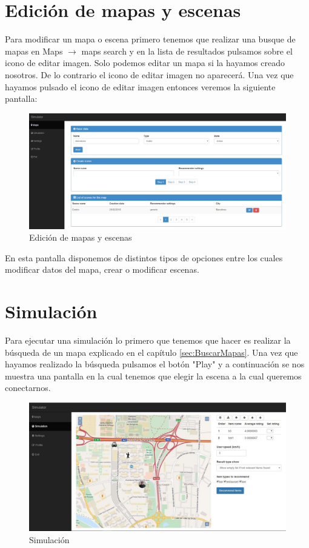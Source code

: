 \section{Edición de mapas y escenas}

Para modificar un mapa o escena primero tenemos que realizar una busque de mapas en Maps $\rightarrow$ maps search y en la lista de resultados pulsamos sobre el icono de editar imagen. Solo podemos editar un mapa si la hayamos creado nosotros. De lo contrario el icono de editar imagen no aparecerá. Una vez que hayamos pulsado el icono de editar imagen entonces veremos la siguiente pantalla:

\begin{figure}[H]
	\centering\includegraphics[scale=0.3]{imagenes/capitulo10/capitulo10.jpg}
	\caption{Edición de mapas y escenas}
	\label{img:UpdateMapScene}
\end{figure}

En esta pantalla disponemos de distintos tipos de opciones entre los cuales modificar datos del mapa, crear o modificar escenas.

\newpage

\section{Simulación}

Para ejecutar una simulación lo primero que tenemos que hacer es realizar la búsqueda de un mapa explicado en el capítulo \ref{sec:BuscarMapas}. Una vez que hayamos realizado la búsqueda pulsamos el botón "Play" y a continuación se nos muestra una pantalla en la cual tenemos que elegir la escena a la cual queremos conectarnos.

\begin{figure}[H]
	\centering\includegraphics[scale=0.3]{imagenes/capitulo11/capitulo11.jpg}
	\caption{Simulación}
	\label{img:Simulation}
\end{figure}

